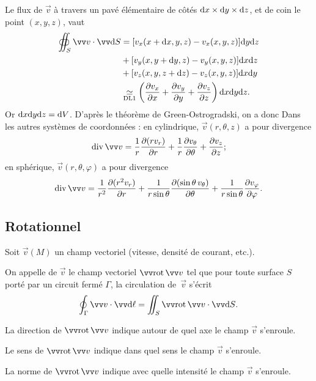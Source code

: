 Le flux de $\Vec{v}$ à travers un pavé élémentaire de côtés $\mathrm{d} x \times \mathrm{d} y \times \mathrm{d} z$, et de coin le point $(x,y,z)$, vaut
\begin{align*}
\oiint_S \Vec{v}\cdot \Vec{\d S} & = [v_x(x+\d x,y,z) - v_x(x,y,z) ]\d y \d z   \\ & + [v_y(x,y+\d y,z) - v_y(x,y,z) ]\d x \d z \\  & + [v_z(x,y,z+\d z) - v_z(x,y,z) ]\d x \d y  \\ &
\underset{\text{DL1}}{\simeq} \left(\dr{v_x}{x} + \dr{v_y}{y} + \dr{v_z}{z}\right) \d x \d y \d z.
\end{align*}
Or $\mathrm{d} x \mathrm{d} y \mathrm{d} z = \mathrm{d} V$.
D'après le théorème de Green-Ostrogradski, on a donc
 Dans les autres systèmes de coordonnées : en cylindrique, $\Vec{v}(r,\theta,z)$ a pour divergence
$$
\dive{\Vec{v}} = \frac{1}{r} \dr{(r v_r)}{r} + \frac{1}{r} \dr{v_\theta}{\theta} + \dr{v_z}{z};
$$
en sphérique, $\Vec{v}(r,\theta,\varphi)$ a pour divergence
$$
\dive{\Vec{v}} = \frac{1}{r^2} \dr{(r^2 v_r)}{r} + \frac{1}{r \sin \theta} \dr{(\sin \theta \, v_\theta)}{\theta} + \frac{1}{r \sin \theta} \dr{v_\varphi}{\varphi}.
$$


\subsection{Rotationnel}

Soit $\Vec{v}(M)$ un champ vectoriel (vitesse, densité de courant, etc.).
\begin{definition}
On appelle  de $\Vec{v}$ le champ vectoriel $\Rot{\Vec{v}}$ tel que pour toute surface $S$ porté par un circuit fermé $\Gamma$, la circulation de~$\Vec{v}$ s’écrit
$$
\oint_\Gamma \Vec{v}\cdot \Vec{\d \ell} = \iint_S \Rot{\Vec{v}} \cdot \Vec{ \d S}.
$$
\end{definition}
\begin{prop}\label{prop:}
La direction de $\Rot{\Vec{v}}$ indique autour de quel axe  le champ $\Vec{v}$ s'enroule.

Le sens  de $\Rot{\Vec{v}}$ indique dans quel sens le champ $\Vec{v}$ s'enroule.

La norme  de $\Rot{\Vec{v}}$ indique avec quelle intensité le champ $\Vec{v}$ s'enroule.
\end{prop}



